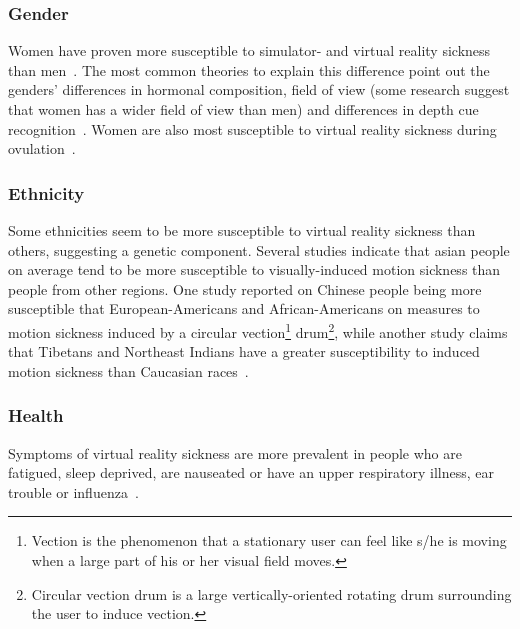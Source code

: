 \subsubsection{Gender}
Women have proven more susceptible to simulator- and virtual reality sickness than men~\citep{Kennedy1985}. 
The most common theories to explain this difference point out the genders' differences
in hormonal composition, field of view (some research suggest that women has a wider field of view than men) and differences in depth cue recognition~\citep{Biomed2012}. 
Women are also most susceptible to virtual reality sickness during ovulation~\citep{Clemes2005}.

\subsubsection{Ethnicity}
Some ethnicities seem to be more susceptible to virtual reality sickness than others, suggesting a genetic component. 
Several studies indicate that asian people on average tend to be more susceptible to visually-induced motion sickness than people from other regions.
One study reported on Chinese people being more susceptible that European-Americans and African-Americans on measures to motion sickness induced by a 
circular vection\footnote{Vection is the phenomenon that a stationary user can feel like s/he is moving when a large part of his or her visual field moves.} 
drum\footnote{Circular vection drum is a large vertically-oriented rotating drum surrounding the user to induce vection.}, 
while another study claims that Tibetans and Northeast Indians have a greater susceptibility to induced motion sickness than Caucasian races~\citep{Barrett2004}.


\subsubsection{Health}
Symptoms of virtual reality sickness are more prevalent in people who are fatigued, sleep deprived, are nauseated or have an upper respiratory illness, 
ear trouble or influenza~\citep{Kolasinski1995}.

